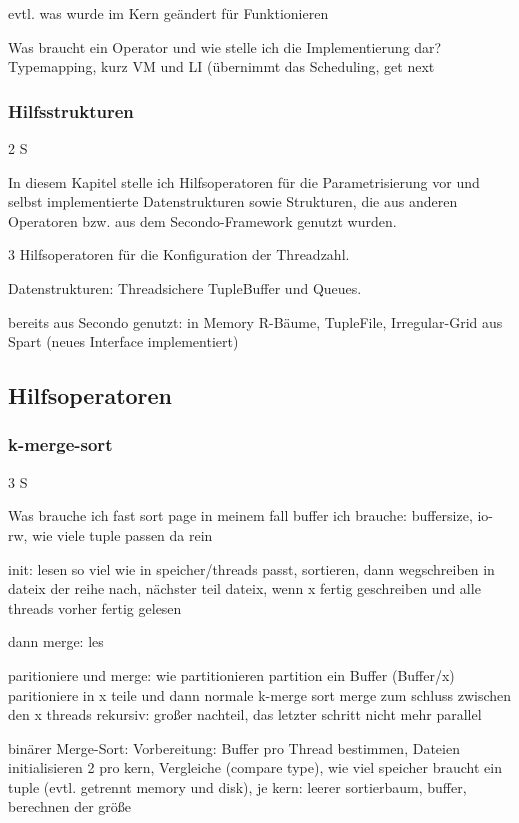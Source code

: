 \documentclass[a4paper,12pt,twoside]{article}
\begin{document}
evtl. was wurde im Kern geändert für Funktionieren

Was braucht ein Operator und wie stelle ich die Implementierung dar? Typemapping, kurz VM und LI (übernimmt das Scheduling, get next

\subsubsection{Hilfsstrukturen} 2 S

In diesem Kapitel stelle ich Hilfsoperatoren für die Parametrisierung vor und selbst implementierte Datenstrukturen sowie Strukturen, die aus anderen Operatoren bzw. aus dem Secondo-Framework genutzt wurden.

3 Hilfsoperatoren für die Konfiguration der Threadzahl.

Datenstrukturen:
Threadsichere TupleBuffer und Queues. 

bereits aus Secondo genutzt: 
in Memory R-Bäume, TupleFile, Irregular-Grid aus Spart (neues Interface implementiert)


\subsection{Hilfsoperatoren}



\subsubsection{k-merge-sort} 3 S

Was brauche ich
fast sort
page in meinem fall buffer
ich brauche: buffersize, io-rw, wie viele tuple passen da rein

init: lesen so viel wie in speicher/threads passt, sortieren, dann wegschreiben in dateix der reihe nach, nächster teil dateix, wenn x fertig geschreiben und alle threads vorher fertig gelesen

dann merge: les

paritioniere und merge: wie partitionieren
partition ein Buffer (Buffer/x)
paritioniere in x teile und dann normale k-merge sort
merge zum schluss zwischen den x threads rekursiv: großer nachteil, das letzter schritt nicht mehr parallel

binärer Merge-Sort:
Vorbereitung: Buffer pro Thread bestimmen, Dateien initialisieren 2 pro kern, Vergleiche (compare type), wie viel speicher braucht ein tuple (evtl. getrennt memory und disk), 
je kern: leerer sortierbaum, buffer, berechnen der größe
\end{document}
